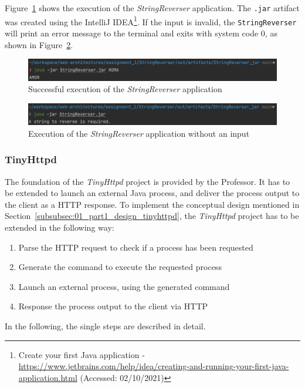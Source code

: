 \documentclass{article}
\def\Sec#1{Section~\ref{#1}}
\def\Fig#1{Figure~\ref{#1}}
\begin{document}
\Fig{fig:01_part1_impl_stringreverser_execution} shows the execution of the \textit{StringReverser} application. The \texttt{.jar} artifact was created using the IntelliJ IDEA\footnote{Create your first Java application - \url{https://www.jetbrains.com/help/idea/creating-and-running-your-first-java-application.html} (Accessed: 02/10/2021)}.
If the input is invalid, the \texttt{StringReverser} will print an error message to the terminal and exits with system code 0, as shown in \Fig{fig:01_part1_impl_stringreverser_execution_fail}.

\begin{figure}[h]
\centering
\includegraphics[scale=0.4]{images/StringReverserExec}
\caption{Successful execution of the \textit{StringReverser} application}
\label{fig:01_part1_impl_stringreverser_execution}
\end{figure}

\begin{figure}[h]
\centering
\includegraphics[scale=0.4]{images/StringReverserExecFail}
\caption{Execution of the \textit{StringReverser} application without an input}
\label{fig:01_part1_impl_stringreverser_execution_fail}
\end{figure}

\subsubsection{TinyHttpd}
The foundation of the \textit{TinyHttpd} project is provided by the Professor. It has to be extended to launch an external Java process, and deliver the process output to the client as a HTTP response.
To implement the conceptual design mentioned in \Sec{subsubsec:01_part1_design_tinyhttpd}, the \textit{TinyHttpd} project has to be extended in the following way:
\begin{enumerate}
\item Parse the HTTP request to check if a process has been requested
\item Generate the command to execute the requested process
\item Launch an external process, using the generated command
\item Response the process output to the client via HTTP
\end{enumerate}
In the following, the single steps are described in detail.
\end{document}
